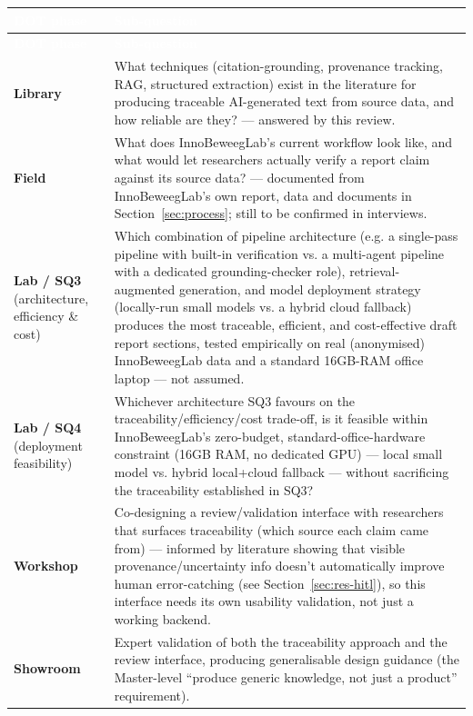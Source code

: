 \begingroup\renewcommand{\arraystretch}{1.3}
\begin{longtable}{|>{\raggedright\arraybackslash}p{3.2cm}|>{\raggedright\arraybackslash}p{11.3cm}|}
\hline
\cellcolor{navy}\textcolor{white}{\textbf{DOT phase}} & \cellcolor{navy}\textcolor{white}{\textbf{Sub-question}} \\ \hline
\endfirsthead
\hline
\cellcolor{navy}\textcolor{white}{\textbf{DOT phase}} & \cellcolor{navy}\textcolor{white}{\textbf{Sub-question}} \\ \hline
\endhead
\textbf{Library} & What techniques (citation-grounding, provenance tracking, RAG, structured extraction) exist in the literature for producing traceable AI-generated text from source data, and how reliable are they? — answered by this review. \\ \hline
\rowcolor{light}
\textbf{Field} & What does InnoBeweegLab's current workflow look like, and what would let researchers actually verify a report claim against its source data? — documented from InnoBeweegLab's own report, data and documents in Section~\ref{sec:process}; still to be confirmed in interviews. \\ \hline
\textbf{Lab / SQ3} (architecture, efficiency \& cost) & Which combination of pipeline architecture (e.g. a single-pass pipeline with built-in verification vs. a multi-agent pipeline with a dedicated grounding-checker role), retrieval-augmented generation, and model deployment strategy (locally-run small models vs. a hybrid cloud fallback) produces the most traceable, efficient, and cost-effective draft report sections, tested empirically on real (anonymised) InnoBeweegLab data and a standard 16GB-RAM office laptop — not assumed. \\ \hline
\rowcolor{light}
\textbf{Lab / SQ4} (deployment feasibility) & Whichever architecture SQ3 favours on the traceability/efficiency/cost trade-off, is it feasible within InnoBeweegLab's zero-budget, standard-office-hardware constraint (16GB RAM, no dedicated GPU) — local small model vs. hybrid local+cloud fallback — without sacrificing the traceability established in SQ3? \\ \hline
\textbf{Workshop} & Co-designing a review/validation interface with researchers that surfaces traceability (which source each claim came from) — informed by literature showing that visible provenance/uncertainty info doesn't automatically improve human error-catching (see Section~\ref{sec:res-hitl}), so this interface needs its own usability validation, not just a working backend. \\ \hline
\rowcolor{light}
\textbf{Showroom} & Expert validation of both the traceability approach and the review interface, producing generalisable design guidance (the Master-level \textquotedblleft{}produce generic knowledge, not just a product\textquotedblright{} requirement). \\ \hline
\end{longtable}
\endgroup

